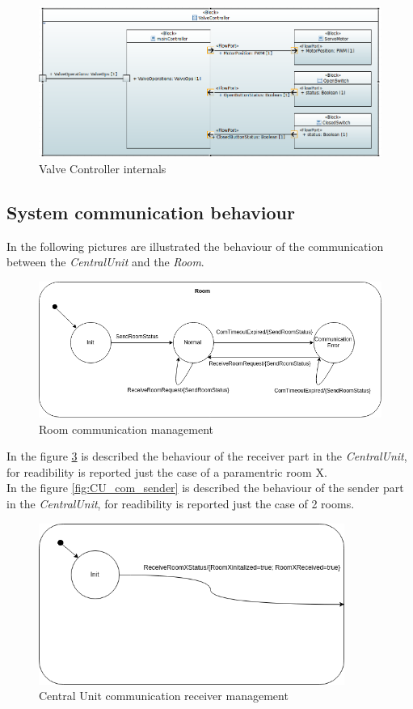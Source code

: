 \begin{figure}[H]
	\centering
	\includegraphics[width=12cm,keepaspectratio]{img/sysml/ValveControllerInternals}
	\caption{Valve Controller internals}
	\label{fig:valve_internals}
\end{figure}

\subsection{System communication behaviour}
In the following pictures are illustrated the behaviour of the communication between the \textit{CentralUnit} and the \textit{Room}.

\begin{figure}[H]
	\centering
	\includegraphics[width=12cm,keepaspectratio]{img/Com_SM_Room}
	\caption{Room communication management}
	\label{fig:room_com}
\end{figure}

In the figure \ref{fig:CU_com_receiver} is described the behaviour of the receiver part in the \textit{CentralUnit}, for readibility is reported just the case of a paramentric room X.\\

In the figure \ref{fig:CU_com_sender} is described the behaviour of the sender part in the \textit{CentralUnit}, for readibility is reported just the case of 2 rooms.

\begin{figure}[H]
	\centering
	\includegraphics[width=10cm,keepaspectratio]{img/Com_SM_CU_Receiver}
	\caption{Central Unit communication receiver management}
	\label{fig:CU_com_receiver}
\end{figure}

